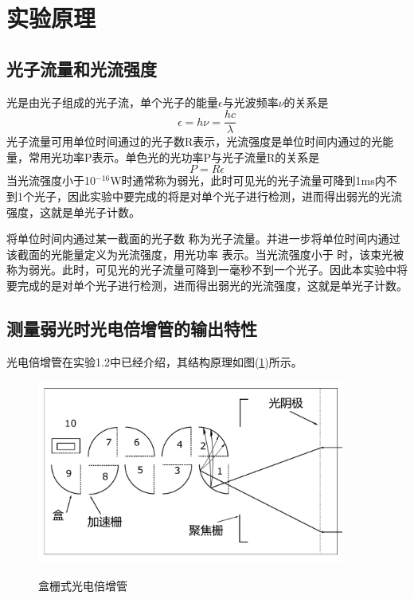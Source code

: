\documentclass[a4paper]{article}
\begin{document}
\section{实验原理}
\subsection{光子流量和光流强度}
光是由光子组成的光子流，单个光子的能量$\epsilon$与光波频率$\nu$的关系是
\begin{equation}
\epsilon = h\nu = \frac{hc}{\lambda}\label{eq1}
\end{equation}
光子流量可用单位时间通过的光子数R表示，光流强度是单位时间内通过的光能量，常用光功率P表示。单色光的光功率P与光子流量R的关系是
\begin{equation}
P = R\epsilon\label{eq2}
\end{equation}
当光流强度小于10$^{-16}$W时通常称为弱光，此时可见光的光子流量可降到1ms内不到1个光子，因此实验中要完成的将是对单个光子进行检测，进而得出弱光的光流强度，这就是单光子计数。

将单位时间内通过某一截面的光子数 称为光子流量。并进一步将单位时间内通过该截面的光能量定义为光流强度，用光功率 表示。当光流强度小于 时，该束光被称为弱光。此时，可见光的光子流量可降到一毫秒不到一个光子。因此本实验中将要完成的是对单个光子进行检测，进而得出弱光的光流强度，这就是单光子计数。

\subsection{测量弱光时光电倍增管的输出特性}
光电倍增管在实验1.2中已经介绍，其结构原理如图(\ref{fig1})所示。
\begin{figure}[!h]
\centering
\includegraphics[width=0.9\textwidth]{fig/fig1.pdf}\\
\caption{盒栅式光电倍增管}\label{fig1}
\end{figure}
\end{document}
